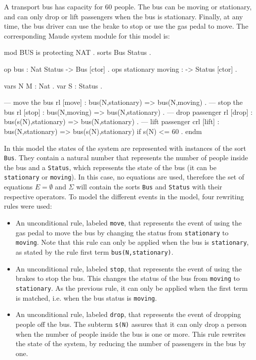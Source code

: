 \begin{example}
\normalfont
A transport bus has capacity for 60 people. The bus can be moving or stationary, and can only drop or lift passengers when the bus is stationary. Finally, at any time, the bus driver can use the brake to stop or use the gas pedal to move. The corresponding Maude system module for this model is:
\\
\begin{maude}
mod BUS is protecting NAT .
  sorts Bus Status .

  op bus : Nat Status -> Bus [ctor] .
  ops stationary moving : -> Status [ctor] .
 
  vars N M : Nat . var S : Status .

  --- move the bus
  rl [move] : bus(N,stationary) => bus(N,moving) .
  --- stop the bus 
  rl [stop] : bus(N,moving) => bus(N,stationary) .
  --- drop passenger
  rl [drop] : bus(s(N),stationary) => bus(N,stationary) .
  --- lift passenger
  crl [lift] : bus(N,stationary) => bus(s(N),stationary) 
                                    if s(N) <= 60 . 
endm
\end{maude}
In this model the states of the system are represented with instances of the sort \texttt{Bus}. They contain a natural number that represents the number of people inside the bus and a \texttt{Status}, which represents the state of the bus (it can be \texttt{stationary} or \texttt{moving}). In this case, no equations are used, therefore the set of equations $E = \emptyset$  and $\Sigma$ will contain the sorts \texttt{Bus} and \texttt{Status} with their respective operators. To model the different events in the model, four rewriting rules were used:
\begin{itemize}
    \item An unconditional rule, labeled \texttt{move}, that represents the event of using the gas pedal to move the bus by changing the status from \texttt{stationary} to \texttt{moving}. Note that this rule can only be applied when the bus is \texttt{stationary}, as stated by the rule first term \texttt{bus(N,stationary)}.
    \item An unconditional rule, labeled \texttt{stop}, that represents the event of using the brakes to stop the bus. This changes the status of the bus from \texttt{moving} to \texttt{stationary}. As the previous rule, it can only be applied when the first term is matched, i.e. when the bus status is \texttt{moving}. 
    \item An unconditional rule, labeled \texttt{drop}, that represents the event of dropping people off the bus. The subterm \texttt{s(N)} assures that it can only drop a person when the number of people inside the bus is one or more. This rule rewrites the state of the system, by reducing the number of passengers in the bus by one.

\end{itemize}
\end{example}
